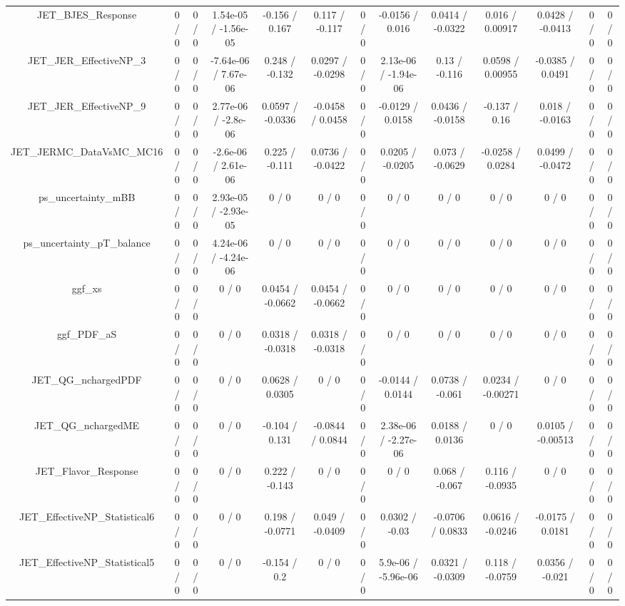 \documentclass[10pt]{article}
\begin{document}
\begin{table}[htbp]
\begin{center}
\begin{tabular}{|c|c|c|c|c|c|c|c|c|c|c|c|c|}
  JET_BJES_Response & 0 / 0 & 0 / 0 & 1.54e-05 / -1.56e-05 & -0.156 / 0.167 & 0.117 / -0.117 & 0 / 0 & -0.0156 / 0.016 & 0.0414 / -0.0322 & 0.016 / 0.00917 & 0.0428 / -0.0413 & 0 / 0 & 0 / 0 \\ 
  JET_JER_EffectiveNP_3 & 0 / 0 & 0 / 0 & -7.64e-06 / 7.67e-06 & 0.248 / -0.132 & 0.0297 / -0.0298 & 0 / 0 & 2.13e-06 / -1.94e-06 & 0.13 / -0.116 & 0.0598 / 0.00955 & -0.0385 / 0.0491 & 0 / 0 & 0 / 0 \\ 
  JET_JER_EffectiveNP_9 & 0 / 0 & 0 / 0 & 2.77e-06 / -2.8e-06 & 0.0597 / -0.0336 & -0.0458 / 0.0458 & 0 / 0 & -0.0129 / 0.0158 & 0.0436 / -0.0158 & -0.137 / 0.16 & 0.018 / -0.0163 & 0 / 0 & 0 / 0 \\ 
  JET_JERMC_DataVsMC_MC16 & 0 / 0 & 0 / 0 & -2.6e-06 / 2.61e-06 & 0.225 / -0.111 & 0.0736 / -0.0422 & 0 / 0 & 0.0205 / -0.0205 & 0.073 / -0.0629 & -0.0258 / 0.0284 & 0.0499 / -0.0472 & 0 / 0 & 0 / 0 \\ 
  ps_uncertainty_mBB & 0 / 0 & 0 / 0 & 2.93e-05 / -2.93e-05 & 0 / 0 & 0 / 0 & 0 / 0 & 0 / 0 & 0 / 0 & 0 / 0 & 0 / 0 & 0 / 0 & 0 / 0 \\ 
  ps_uncertainty_pT_balance & 0 / 0 & 0 / 0 & 4.24e-06 / -4.24e-06 & 0 / 0 & 0 / 0 & 0 / 0 & 0 / 0 & 0 / 0 & 0 / 0 & 0 / 0 & 0 / 0 & 0 / 0 \\ 
  ggf_xs & 0 / 0 & 0 / 0 & 0 / 0 & 0.0454 / -0.0662 & 0.0454 / -0.0662 & 0 / 0 & 0 / 0 & 0 / 0 & 0 / 0 & 0 / 0 & 0 / 0 & 0 / 0 \\ 
  ggf_PDF_aS & 0 / 0 & 0 / 0 & 0 / 0 & 0.0318 / -0.0318 & 0.0318 / -0.0318 & 0 / 0 & 0 / 0 & 0 / 0 & 0 / 0 & 0 / 0 & 0 / 0 & 0 / 0 \\ 
  JET_QG_nchargedPDF & 0 / 0 & 0 / 0 & 0 / 0 & 0.0628 / 0.0305 & 0 / 0 & 0 / 0 & -0.0144 / 0.0144 & 0.0738 / -0.061 & 0.0234 / -0.00271 & 0 / 0 & 0 / 0 & 0 / 0 \\ 
  JET_QG_nchargedME & 0 / 0 & 0 / 0 & 0 / 0 & -0.104 / 0.131 & -0.0844 / 0.0844 & 0 / 0 & 2.38e-06 / -2.27e-06 & 0.0188 / 0.0136 & 0 / 0 & 0.0105 / -0.00513 & 0 / 0 & 0 / 0 \\ 
  JET_Flavor_Response & 0 / 0 & 0 / 0 & 0 / 0 & 0.222 / -0.143 & 0 / 0 & 0 / 0 & 0 / 0 & 0.068 / -0.067 & 0.116 / -0.0935 & 0 / 0 & 0 / 0 & 0 / 0 \\ 
  JET_EffectiveNP_Statistical6 & 0 / 0 & 0 / 0 & 0 / 0 & 0.198 / -0.0771 & 0.049 / -0.0409 & 0 / 0 & 0.0302 / -0.03 & -0.0706 / 0.0833 & 0.0616 / -0.0246 & -0.0175 / 0.0181 & 0 / 0 & 0 / 0 \\ 
  JET_EffectiveNP_Statistical5 & 0 / 0 & 0 / 0 & 0 / 0 & -0.154 / 0.2 & 0 / 0 & 0 / 0 & 5.9e-06 / -5.96e-06 & 0.0321 / -0.0309 & 0.118 / -0.0759 & 0.0356 / -0.021 & 0 / 0 & 0 / 0 \\ 

\end{tabular}
\end{center}
\end{table}
\end{document}
